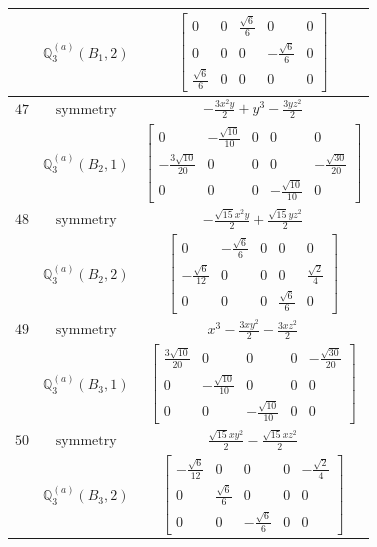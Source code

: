 \documentclass[fleqn,8pt,landscape]{jsarticle}
\begin{document}
\begin{longtable}{ccc}
$  $ & $ \mathbb{Q}_{3}^{(a)}(B_{1},2) $ & $ \begin{bmatrix} 0 & 0 & \frac{\sqrt{6}}{6} & 0 & 0 \\ 0 & 0 & 0 & - \frac{\sqrt{6}}{6} & 0 \\ \frac{\sqrt{6}}{6} & 0 & 0 & 0 & 0 \end{bmatrix} $ \\ \hline
$ 47 $ & $ \text{symmetry} $ & $ - \frac{3 x^{2} y}{2} + y^{3} - \frac{3 y z^{2}}{2} $ \\
$  $ & $ \mathbb{Q}_{3}^{(a)}(B_{2},1) $ & $ \begin{bmatrix} 0 & - \frac{\sqrt{10}}{10} & 0 & 0 & 0 \\ - \frac{3 \sqrt{10}}{20} & 0 & 0 & 0 & - \frac{\sqrt{30}}{20} \\ 0 & 0 & 0 & - \frac{\sqrt{10}}{10} & 0 \end{bmatrix} $ \\ \hline
$ 48 $ & $ \text{symmetry} $ & $ - \frac{\sqrt{15} x^{2} y}{2} + \frac{\sqrt{15} y z^{2}}{2} $ \\
$  $ & $ \mathbb{Q}_{3}^{(a)}(B_{2},2) $ & $ \begin{bmatrix} 0 & - \frac{\sqrt{6}}{6} & 0 & 0 & 0 \\ - \frac{\sqrt{6}}{12} & 0 & 0 & 0 & \frac{\sqrt{2}}{4} \\ 0 & 0 & 0 & \frac{\sqrt{6}}{6} & 0 \end{bmatrix} $ \\ \hline
$ 49 $ & $ \text{symmetry} $ & $ x^{3} - \frac{3 x y^{2}}{2} - \frac{3 x z^{2}}{2} $ \\
$  $ & $ \mathbb{Q}_{3}^{(a)}(B_{3},1) $ & $ \begin{bmatrix} \frac{3 \sqrt{10}}{20} & 0 & 0 & 0 & - \frac{\sqrt{30}}{20} \\ 0 & - \frac{\sqrt{10}}{10} & 0 & 0 & 0 \\ 0 & 0 & - \frac{\sqrt{10}}{10} & 0 & 0 \end{bmatrix} $ \\ \hline
$ 50 $ & $ \text{symmetry} $ & $ \frac{\sqrt{15} x y^{2}}{2} - \frac{\sqrt{15} x z^{2}}{2} $ \\
$  $ & $ \mathbb{Q}_{3}^{(a)}(B_{3},2) $ & $ \begin{bmatrix} - \frac{\sqrt{6}}{12} & 0 & 0 & 0 & - \frac{\sqrt{2}}{4} \\ 0 & \frac{\sqrt{6}}{6} & 0 & 0 & 0 \\ 0 & 0 & - \frac{\sqrt{6}}{6} & 0 & 0 \end{bmatrix} $ \\ \hline

\end{longtable}
\end{document}
